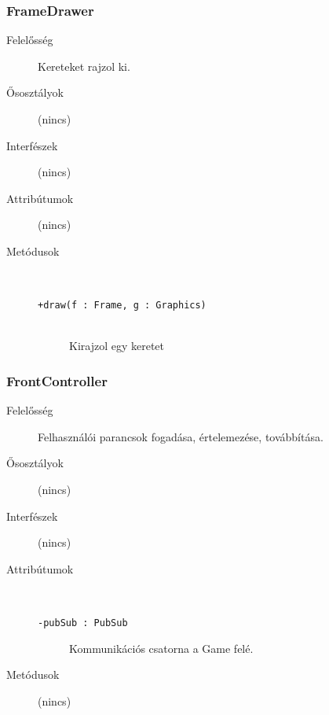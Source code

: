 		\subsubsection{FrameDrawer}
			\begin{description}

				\item[Felelősség] Kereteket rajzol ki.

				\item[Ősosztályok] (nincs)
				\item[Interfészek] (nincs)
				\item[Attribútumok] (nincs)
				\item[Metódusok]$\ $
					\begin{description}
						\item[\texttt{+draw(f : Frame, g : Graphics)}] \hfill \\Kirajzol egy keretet 
					\end{description}
			\end{description}

		\subsubsection{FrontController}
			\begin{description}

				\item[Felelősség] Felhasználói parancsok fogadása, értelemezése, továbbítása.

				\item[Ősosztályok] (nincs)
				\item[Interfészek] (nincs)
				\item[Attribútumok]$\ $
					\begin{description}
						\item[\texttt{-pubSub : PubSub}]Kommunikációs csatorna a Game felé.
					\end{description}
				\item[Metódusok] (nincs)
			\end{description}
			
